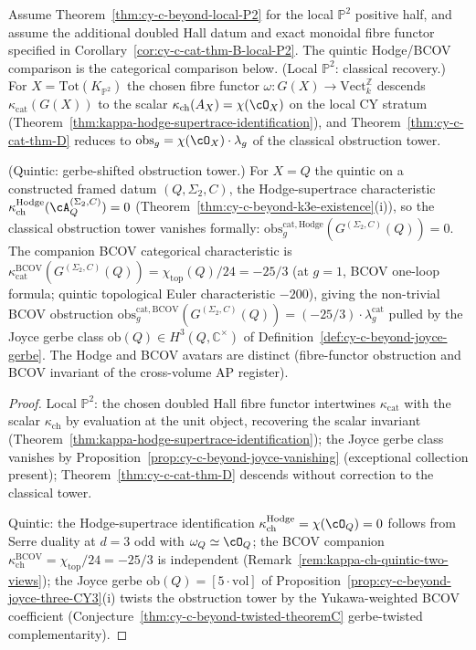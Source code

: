 \begin{corollary}
\label{cor:cy-c-cat-thm-D-examples}
Assume Theorem~\ref{thm:cy-c-beyond-local-P2} for the local
$\mathbb P^2$ positive half, and assume the additional doubled Hall
datum and exact monoidal fibre functor specified in
Corollary~\ref{cor:cy-c-cat-thm-B-local-P2}. The quintic Hodge/BCOV
comparison is the categorical comparison below.
\textup{(Local $\mathbb P^2$: classical recovery.)}
For $X = \mathrm{Tot}(K_{\mathbb P^2})$ the chosen fibre functor
\(\omega : G(X) \to \mathrm{Vect}_k^{\mathbb Z}\) descends
$\kappa_{\mathrm{cat}}(G(X))$ to the scalar
$\kappa_{\mathrm{ch}}(A_X) = \chi(\cO_X)$ on the local CY stratum
(Theorem~\ref{thm:kappa-hodge-supertrace-identification}), and
Theorem~\ref{thm:cy-c-cat-thm-D} reduces to
$\mathrm{obs}_g = \chi(\cO_X) \cdot \lambda_g$ of the classical
obstruction tower.

\textup{(Quintic: gerbe-shifted obstruction tower.)}
For $X = Q$ the quintic on a constructed framed datum
$(Q,\Sigma_2,C)$, the Hodge-supertrace characteristic
$\kappa_{\mathrm{ch}}^{\mathrm{Hodge}}(\cA_Q^{(\Sigma_2,C)}) = 0$
(Theorem~\ref{thm:cy-c-beyond-k3e-existence}\textup{(i)}), so the
classical obstruction tower vanishes formally:
$\mathrm{obs}_g^{\mathrm{cat}, \mathrm{Hodge}}(G^{(\Sigma_2,C)}(Q)) = 0$. The companion
BCOV categorical characteristic is
$\kappa_{\mathrm{cat}}^{\mathrm{BCOV}}(G^{(\Sigma_2,C)}(Q)) = \chi_{\mathrm{top}}(Q)/24 = -25/3$
(at $g=1$, BCOV one-loop formula; quintic topological Euler
characteristic $-200$), giving the non-trivial BCOV obstruction
$\mathrm{obs}_g^{\mathrm{cat}, \mathrm{BCOV}}(G^{(\Sigma_2,C)}(Q)) = (-25/3) \cdot \lambda_g^{\mathrm{cat}}$
pulled by the Joyce gerbe class
$\mathrm{ob}(Q) \in H^3(Q, \mathbb C^\times)$ of
Definition~\ref{def:cy-c-beyond-joyce-gerbe}. The Hodge and BCOV
avatars are distinct (fibre-functor obstruction and BCOV invariant of the cross-volume
AP register).
\end{corollary}

\begin{proof}
Local $\mathbb P^2$: the chosen doubled Hall fibre functor intertwines
$\kappa_{\mathrm{cat}}$ with the scalar $\kappa_{\mathrm{ch}}$ by evaluation at the
unit object, recovering the scalar invariant
(Theorem~\ref{thm:kappa-hodge-supertrace-identification}); the Joyce
gerbe class vanishes by
Proposition~\ref{prop:cy-c-beyond-joyce-vanishing} (exceptional
collection present); Theorem~\ref{thm:cy-c-cat-thm-D} descends without
correction to the classical tower.

Quintic: the Hodge-supertrace identification
$\kappa_{\mathrm{ch}}^{\mathrm{Hodge}} = \chi(\cO_Q) = 0$ follows from
Serre duality at $d = 3$ odd with $\omega_Q \simeq \cO_Q$; the BCOV
companion $\kappa_{\mathrm{ch}}^{\mathrm{BCOV}} = \chi_{\mathrm{top}}/24 = -25/3$
is
independent (Remark~\ref{rem:kappa-ch-quintic-two-views}); the Joyce
gerbe $\mathrm{ob}(Q) = [5 \cdot \mathrm{vol}]$ of
Proposition~\ref{prop:cy-c-beyond-joyce-three-CY3}(i) twists the
obstruction tower by the Yukawa-weighted BCOV coefficient
(Conjecture~\ref{thm:cy-c-beyond-twisted-theoremC} gerbe-twisted
complementarity).
\end{proof}

